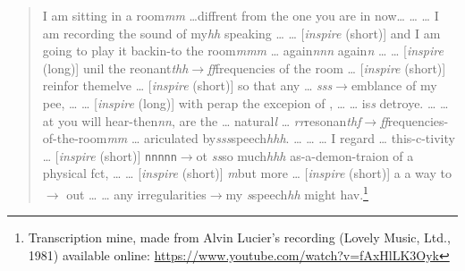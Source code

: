 \begin{quote}
	I am sitting in a room\textit{mm} \dots diffrent from the one you are in now\dots{} \dots{} \dots{} I am recording the sound of my\textit{hh} speaking  \dots{} \dots{} [\textit{inspire} (short)] and I am going to play it backin-to the room\textit{mmm} \dots{} again\textit{nnn}  again\textit{n} \dots{} \dots{} [\textit{inspire} (long)] unil the reonant\textit{thh$\rightarrow$ff}frequencies of the room \dots{} [\textit{inspire} (short)] reinfor themelve \dots{} [\textit{inspire} (short)] so that any \dots{}  \textit{sss}$\rightarrow$emblance of my pee, \dots{} \dots{} [\textit{inspire} (long)] with perap the excepion of , \dots{} \dots{} is\textit{s} detroye. \dots{} \dots{} at you will hear-then\textit{nn}, are the \dots{} natural\textit{l} \dots{}  \textit{rr}resonan\textit{thf$\rightarrow$ff}requencies-of-the-room\textit{mm} \dots{} ariculated by\textit{sss}speech\textit{hhh}. \dots{} \dots{} \dots{} I regard \dots{} this-c-tivity \dots{} [\textit{inspire} (short)] \texttt{nnnnn$\rightarrow$}ot \textit{ss}so much\textit{hhh} as-a-demon-traion of a physical fct, \dots{} \dots{} [\textit{inspire} (short)] \textit{m}but more \dots{} [\textit{inspire} (short)] a a way {} to$\rightarrow$ out \dots{} \dots{} any irregularities$\rightarrow$my \textit{s}speech\textit{hh} might hav.\footnote{Transcription mine, made from Alvin Lucier's recording (Lovely Music, Ltd., 1981) \parencite{Luc70:Iam} available online: \url{https://www.youtube.com/watch?v=fAxHlLK3Oyk}}
\end{quote}


